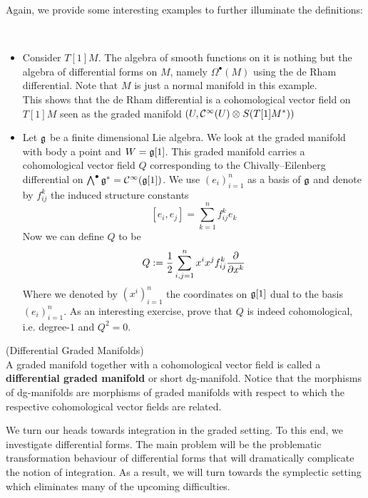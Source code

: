 Again, we provide some interesting examples to further illuminate the definitions:

\begin{example}~
\begin{itemize}
  \item Consider $T[1]M$. The algebra of smooth functions on it is nothing but the algebra of differential forms on $M$, namely $\Omega^\bullet(M)$ using the de Rham differential. Note that $M$ is just a normal manifold in this example.\\
  This shows that the de Rham differential is a cohomological vector field on $T[1]M$ seen as the graded manifold $(U, \mathcal{C}^{\infty}(U) \mathbin{\mathop{\otimes}\displaylimits_{}}S(T[1]M^*))$

  \item Let $\mathfrak{g}$ be a finite dimensional Lie algebra. We look at the graded manifold with body a point and $W=\mathfrak{g} [1]$. This graded manifold carries a cohomological vector field $Q$ corresponding to the Chivally--Eilenberg differential on $\bigwedge^\bullet \mathfrak{g}^* = \mathcal{C}^{\infty}(\mathfrak{g}[1])$. We use $(e_i)^n_{i=1}$ as a basis of $\mathfrak{g}$ and denote by $f^k_{ij}$ the induced structure constants
  $$ [e_i, e_j] = \sum_{k=1}^n f_{ij}^k e_k $$
  Now we can define $Q$ to be
  $$ Q := \frac{1}{2} \sum_{i,j = 1}^n x^i x^j f_{ij}^k \frac{\partial }{\partial x^k} $$
  Where we denoted by $(x^i)_{i=1}^n$ the coordinates on $\mathfrak{g}[1]$ dual to the basis $(e_i)^n_{i=1}$. As an interesting exercise, prove that $Q$ is indeed cohomological, i.e. degree-$1$ and $Q^2=0$.
\end{itemize}
\end{example}


\begin{definition} (Differential Graded Manifolds)\\
  A graded manifold together with a cohomological vector field is called a \textbf{differential graded manifold} or short dg-manifold. Notice that the morphisms of dg-manifolds are morphisms of graded manifolds with respect to which the respective cohomological vector fields are related.
\end{definition}

We turn our heads towards integration in the graded setting. To this end, we investigate differential forms. The main problem will be the problematic transformation behaviour of differential forms that will dramatically complicate the notion of integration. As a result, we will turn towards the symplectic setting which eliminates many of the upcoming difficulties.\\

